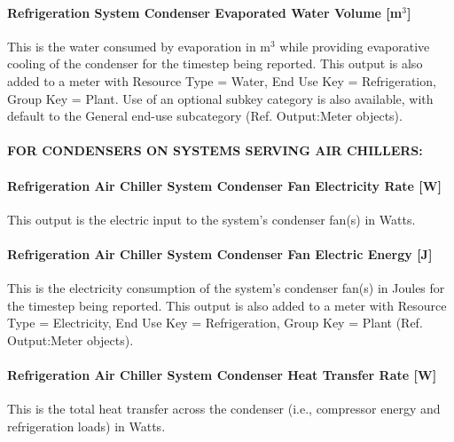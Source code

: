 \paragraph{Refrigeration System Condenser Evaporated Water Volume {[}m\(^{3}\){]}}\label{refrigeration-system-condenser-evaporated-water-volume-m3}

This is the water consumed by evaporation in m\(^{3}\) while providing evaporative cooling of the condenser for the timestep being reported. This output is also added to a meter with Resource Type = Water, End Use Key = Refrigeration, Group Key = Plant. Use of an optional subkey category is also available, with default to the General end-use subcategory (Ref. Output:Meter objects).

\paragraph{FOR CONDENSERS ON SYSTEMS SERVING AIR CHILLERS:}\label{for-condensers-on-systems-serving-air-chillers-1}

\paragraph{Refrigeration Air Chiller System Condenser Fan Electricity Rate {[}W{]}}\label{refrigeration-air-chiller-system-condenser-fan-electric-power-w-1}

This output is the electric input to the system's condenser fan(s) in Watts.

\paragraph{Refrigeration Air Chiller System Condenser Fan Electric Energy {[}J{]}}\label{refrigeration-air-chiller-system-condenser-fan-electric-energy-j-1}

This is the electricity consumption of the system's condenser fan(s) in Joules for the timestep being reported. This output is also added to a meter with Resource Type = Electricity, End Use Key = Refrigeration, Group Key = Plant (Ref. Output:Meter objects).

\paragraph{Refrigeration Air Chiller System Condenser Heat Transfer Rate {[}W{]}}\label{refrigeration-air-chiller-system-condenser-heat-transfer-rate-w-1}

This is the total heat transfer across the condenser (i.e., compressor energy and refrigeration loads) in Watts.

